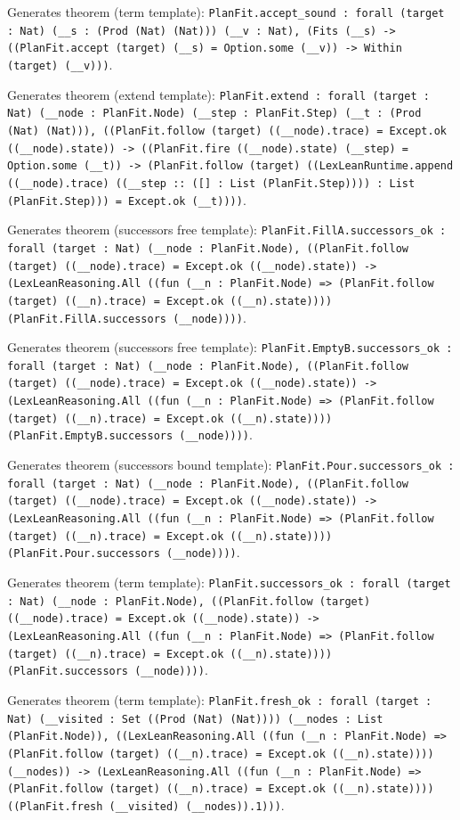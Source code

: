 \documentclass[11pt]{article}
\begin{document}
\noindent Generates theorem (term template): \texttt{PlanFit.accept\_sound : forall (target : Nat) (\_\_s : (Prod (Nat) (Nat))) (\_\_v : Nat), (Fits (\_\_s) -> ((PlanFit.accept (target) (\_\_s) = Option.some (\_\_v)) -> Within (target) (\_\_v)))}.\par
\noindent Generates theorem (extend template): \texttt{PlanFit.extend : forall (target : Nat) (\_\_node : PlanFit.Node) (\_\_step : PlanFit.Step) (\_\_t : (Prod (Nat) (Nat))), ((PlanFit.follow (target) ((\_\_node).trace) = Except.ok ((\_\_node).state)) -> ((PlanFit.fire ((\_\_node).state) (\_\_step) = Option.some (\_\_t)) -> (PlanFit.follow (target) ((LexLeanRuntime.append ((\_\_node).trace) ((\_\_step :: ([] : List (PlanFit.Step)))) : List (PlanFit.Step))) = Except.ok (\_\_t))))}.\par
\noindent Generates theorem (successors free template): \texttt{PlanFit.FillA.successors\_ok : forall (target : Nat) (\_\_node : PlanFit.Node), ((PlanFit.follow (target) ((\_\_node).trace) = Except.ok ((\_\_node).state)) -> (LexLeanReasoning.All ((fun (\_\_n : PlanFit.Node) => (PlanFit.follow (target) ((\_\_n).trace) = Except.ok ((\_\_n).state)))) (PlanFit.FillA.successors (\_\_node))))}.\par
\noindent Generates theorem (successors free template): \texttt{PlanFit.EmptyB.successors\_ok : forall (target : Nat) (\_\_node : PlanFit.Node), ((PlanFit.follow (target) ((\_\_node).trace) = Except.ok ((\_\_node).state)) -> (LexLeanReasoning.All ((fun (\_\_n : PlanFit.Node) => (PlanFit.follow (target) ((\_\_n).trace) = Except.ok ((\_\_n).state)))) (PlanFit.EmptyB.successors (\_\_node))))}.\par
\noindent Generates theorem (successors bound template): \texttt{PlanFit.Pour.successors\_ok : forall (target : Nat) (\_\_node : PlanFit.Node), ((PlanFit.follow (target) ((\_\_node).trace) = Except.ok ((\_\_node).state)) -> (LexLeanReasoning.All ((fun (\_\_n : PlanFit.Node) => (PlanFit.follow (target) ((\_\_n).trace) = Except.ok ((\_\_n).state)))) (PlanFit.Pour.successors (\_\_node))))}.\par
\noindent Generates theorem (term template): \texttt{PlanFit.successors\_ok : forall (target : Nat) (\_\_node : PlanFit.Node), ((PlanFit.follow (target) ((\_\_node).trace) = Except.ok ((\_\_node).state)) -> (LexLeanReasoning.All ((fun (\_\_n : PlanFit.Node) => (PlanFit.follow (target) ((\_\_n).trace) = Except.ok ((\_\_n).state)))) (PlanFit.successors (\_\_node))))}.\par
\noindent Generates theorem (term template): \texttt{PlanFit.fresh\_ok : forall (target : Nat) (\_\_visited : Set ((Prod (Nat) (Nat)))) (\_\_nodes : List (PlanFit.Node)), ((LexLeanReasoning.All ((fun (\_\_n : PlanFit.Node) => (PlanFit.follow (target) ((\_\_n).trace) = Except.ok ((\_\_n).state)))) (\_\_nodes)) -> (LexLeanReasoning.All ((fun (\_\_n : PlanFit.Node) => (PlanFit.follow (target) ((\_\_n).trace) = Except.ok ((\_\_n).state)))) ((PlanFit.fresh (\_\_visited) (\_\_nodes)).1)))}.\par
\end{document}

